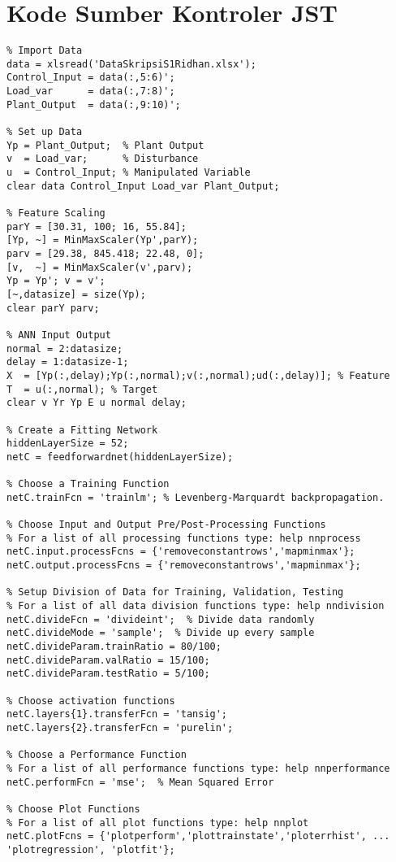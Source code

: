 \section{Kode Sumber Kontroler JST}
\begin{lstlisting}
% Import Data
data = xlsread('DataSkripsiS1Ridhan.xlsx');
Control_Input = data(:,5:6)';
Load_var      = data(:,7:8)';
Plant_Output  = data(:,9:10)';

% Set up Data
Yp = Plant_Output;  % Plant Output
v  = Load_var;      % Disturbance
u  = Control_Input; % Manipulated Variable
clear data Control_Input Load_var Plant_Output;

% Feature Scaling
parY = [30.31, 100; 16, 55.84];
[Yp, ~] = MinMaxScaler(Yp',parY);
parv = [29.38, 845.418; 22.48, 0];
[v,  ~] = MinMaxScaler(v',parv);
Yp = Yp'; v = v';
[~,datasize] = size(Yp);
clear parY parv;

% ANN Input Output
normal = 2:datasize;
delay = 1:datasize-1;
X  = [Yp(:,delay);Yp(:,normal);v(:,normal);ud(:,delay)]; % Feature
T  = u(:,normal); % Target
clear v Yr Yp E u normal delay;

% Create a Fitting Network
hiddenLayerSize = 52;
netC = feedforwardnet(hiddenLayerSize);

% Choose a Training Function
netC.trainFcn = 'trainlm'; % Levenberg-Marquardt backpropagation.

% Choose Input and Output Pre/Post-Processing Functions
% For a list of all processing functions type: help nnprocess
netC.input.processFcns = {'removeconstantrows','mapminmax'};
netC.output.processFcns = {'removeconstantrows','mapminmax'};

% Setup Division of Data for Training, Validation, Testing
% For a list of all data division functions type: help nndivision
netC.divideFcn = 'divideint';  % Divide data randomly
netC.divideMode = 'sample';  % Divide up every sample
netC.divideParam.trainRatio = 80/100;
netC.divideParam.valRatio = 15/100;
netC.divideParam.testRatio = 5/100;

% Choose activation functions
netC.layers{1}.transferFcn = 'tansig';
netC.layers{2}.transferFcn = 'purelin';

% Choose a Performance Function
% For a list of all performance functions type: help nnperformance
netC.performFcn = 'mse';  % Mean Squared Error

% Choose Plot Functions
% For a list of all plot functions type: help nnplot
netC.plotFcns = {'plotperform','plottrainstate','ploterrhist', ...
'plotregression', 'plotfit'};


\end{lstlisting}
